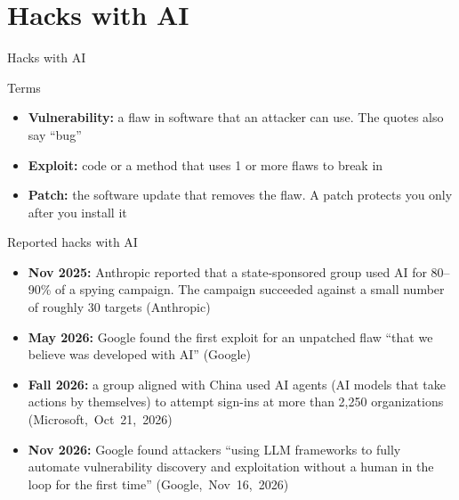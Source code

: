\documentclass[11pt]{beamer}
\newcommand{\srccite}[1]{{\scriptsize\textcolor{citecol}{#1}}}
\renewcommand{\srccite}[1]{{\scriptsize\textcolor{citecol}{\mbox{#1}}}}
\begin{document}
\section{Hacks with AI}

\begin{transition}{}{Hacks with AI}
\end{transition}


\begin{frame}{Terms}
\pause
\begin{itemize}\setlength\itemsep{12pt}
\item \textbf{Vulnerability:} a flaw in software that an attacker can use. The quotes also say ``bug'' \pause
\item \textbf{Exploit:} code or a method that uses 1 or more flaws to break in \pause
\item \textbf{Patch:} the software update that removes the flaw. A patch protects you only after you install it
\end{itemize}
\end{frame}


\begin{frame}{Reported hacks with AI}
\pause
\begin{itemize}\setlength\itemsep{8pt}
\item \textbf{Nov 2025:} Anthropic reported that a state-sponsored group used AI for 80--90\% of a spying campaign. The campaign succeeded against a small number of roughly 30 targets \srccite{(Anthropic)} \pause
\item \textbf{May 2026:} Google found the first exploit for an unpatched flaw ``that we believe was developed with AI'' \srccite{(Google)} \pause
\item \textbf{Fall 2026:} a group aligned with China used AI agents (AI models that take actions by themselves) to attempt sign-ins at more than 2,250 organizations \srccite{(Microsoft, Oct 21, 2026)} \pause
\item \textbf{Nov 2026:} Google found attackers ``using LLM frameworks to fully automate vulnerability discovery and exploitation without a human in the loop for the first time'' \srccite{(Google, Nov 16, 2026)}
\end{itemize}
\end{frame}
\end{document}
